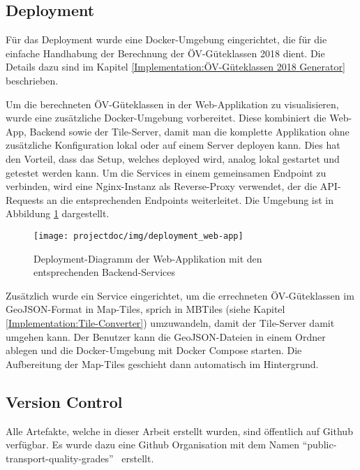 \subsection{Deployment}
\label{Infrastruktur:Deployment}

Für das Deployment wurde eine Docker-Umgebung eingerichtet, die für die einfache Handhabung der Berechnung der \gls{ÖV-Güteklassen} 2018 dient.
Die Details dazu sind im Kapitel \ref{Implementation:ÖV-Güteklassen 2018 Generator} beschrieben.

Um die berechneten \gls{ÖV-Güteklassen} in der Web-Applikation zu visualisieren, wurde eine zusätzliche Docker-Umgebung vorbereitet.
Diese kombiniert die Web-App, Backend sowie der Tile-Server, damit man die komplette Applikation ohne zusätzliche Konfiguration lokal oder auf einem Server deployen kann.
Dies hat den Vorteil, dass das Setup, welches deployed wird, analog lokal gestartet und getestet werden kann.
Um die Services in einem gemeinsamen Endpoint zu verbinden, wird eine Nginx-Instanz als Reverse-Proxy verwendet, der die \acs{API}-Requests an die entsprechenden Endpoints weiterleitet.
Die Umgebung ist in Abbildung \ref{fig:deployment_web-app} dargestellt.

\begin{figure}[ht]
    \centering
    \texttt{[image: projectdoc/img/deployment\_web-app]}
    \caption[Deployment-Diagramm der Web-Applikation]{Deployment-Diagramm der Web-Applikation mit den entsprechenden Backend-Services}
    \label{fig:deployment_web-app}
\end{figure}

Zusätzlich wurde ein Service eingerichtet, um die errechneten \gls{ÖV-Güteklassen} im \gls{GeoJSON}-Format in Map-Tiles, sprich in MBTiles (siehe Kapitel \ref{Implementation:Tile-Converter}) umzuwandeln, damit der Tile-Server damit umgehen kann.
Der Benutzer kann die \gls{GeoJSON}-Dateien in einem Ordner ablegen und die Docker-Umgebung mit Docker Compose starten.
Die Aufbereitung der Map-Tiles geschieht dann automatisch im Hintergrund.

\subsection{Version Control}
\label{Infrastruktur:Version Control}

Alle Artefakte, welche in dieser Arbeit erstellt wurden, sind öffentlich auf Github verfügbar.
Es wurde dazu eine Github Organisation mit dem Namen "`public-transport-quality-grades"'~\cite{github} erstellt.

